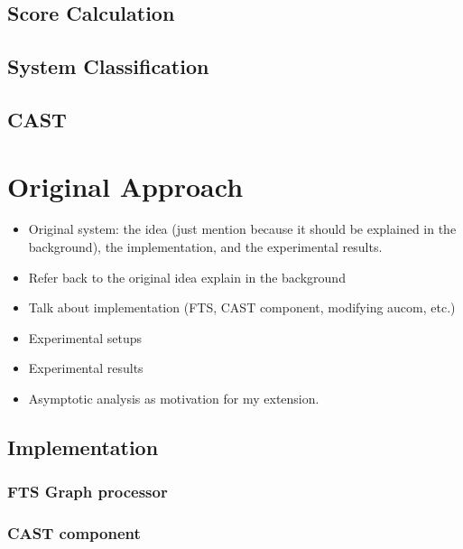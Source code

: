 \documentclass[11pt, a4paper]{report}
\begin{document}
\section{Score Calculation}
\section{System Classification}
\section{CAST}



\chapter{Original Approach}
\label{cha:orig-approach}

\begin{itemize}
\item Original system: the idea (just mention because it should be
  explained in the background), the implementation, and the
  experimental results.
\item Refer back to the original idea explain in the background
\item Talk about implementation (FTS, CAST component, modifying aucom, etc.)
\item Experimental setups
\item Experimental results
\item Asymptotic analysis as motivation for my extension.
\end{itemize}

\section{Implementation}
\subsection{FTS Graph processor}
\subsection{CAST component}
\end{document}
